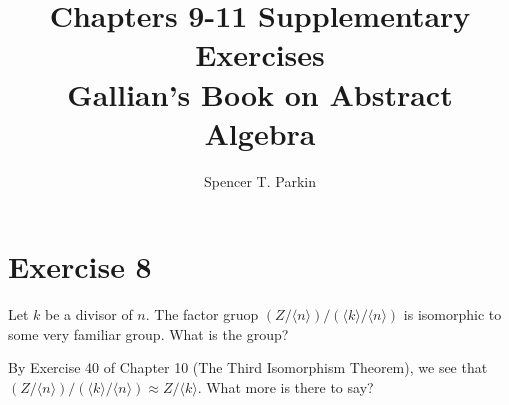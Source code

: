 \documentclass[12pt]{article}
\title{Chapters 9-11 Supplementary Exercises\\Gallian's Book on Abstract Algebra}
\author{Spencer T. Parkin}
\begin{document}
\maketitle

\section*{Exercise 8}

Let $k$ be a divisor of $n$.  The factor gruop $(Z/\langle n\rangle)/(\langle k\rangle/\langle n\rangle)$
is isomorphic to some very familiar group.  What is the group?

By Exercise 40 of Chapter 10 (The Third Isomorphism Theorem), we
see that $(Z/\langle n\rangle)/(\langle k\rangle/\langle n\rangle)\approx Z/\langle k\rangle$.
What more is there to say?
\end{document}
